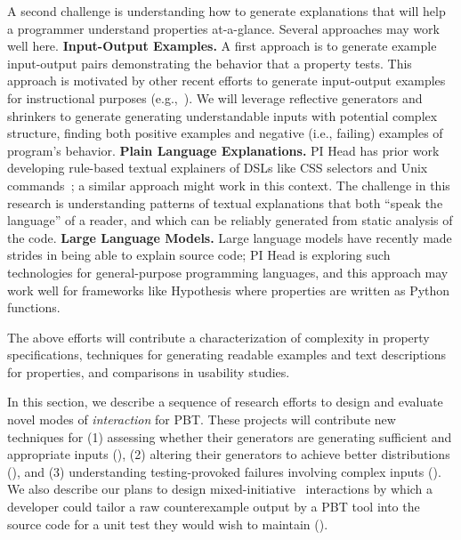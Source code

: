 A second challenge is understanding how to generate explanations that will help
a programmer understand properties at-a-glance. Several approaches may work well
here.
{\bf Input-Output Examples.} A first approach is to generate
example input-output pairs demonstrating the behavior that a property tests.
This approach is motivated by other recent efforts to generate input-output
examples for instructional
purposes (e.g.,~\cite{ref:gerdes2018understanding,ref:dantoni2015can}).
We will leverage reflective generators and shrinkers to generate
generating understandable inputs with potential complex structure, finding
both positive examples and negative (i.e., failing) examples of program's behavior.
{\bf Plain Language Explanations.} PI Head has prior work developing rule-based textual explainers of
DSLs like CSS selectors and Unix commands~\cite{ref:head2015tutorons}; a similar
approach might work in this context.
The challenge in this research is understanding
patterns of textual explanations that both ``speak the language'' of a reader,
and which can be reliably generated from static analysis of the code.
{\bf Large Language Models.} Large language models have recently
made strides in being able to explain  source code; PI Head is
exploring such technologies for general-purpose programming languages, and this
approach may work well for frameworks like Hypothesis where properties are
written as Python functions.

The above efforts will contribute
a characterization of complexity in property specifications,
techniques for generating readable examples and text descriptions for
properties, and comparisons in
usability studies.


In this section, we
describe a sequence of research efforts to design and evaluate novel modes of
{\em interaction} for PBT. These projects will contribute new
techniques for (1) assessing whether their generators are generating
sufficient and
appropriate inputs (), (2)
altering their generators to achieve better distributions
(),
and (3) understanding testing-provoked failures involving complex inputs
().
%
We also describe our plans to design mixed-initiative~\cite{ref:allen1999mixed}
interactions by which a developer could tailor a raw counterexample output by a
PBT tool into the source code for a unit test they would wish to maintain
().
%

